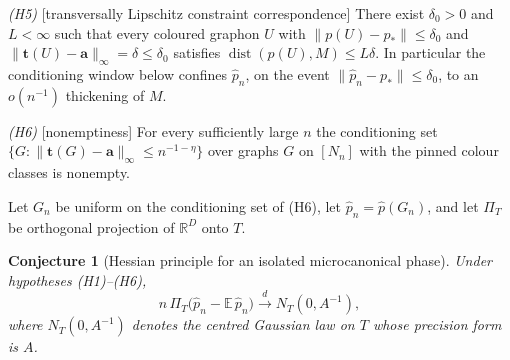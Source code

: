 \documentclass[11pt]{article}
\newtheorem{conjecture}{Conjecture}
\theoremstyle{definition}
\newcommand{\E}{\mathbb E}
\newcommand{\R}{\mathbb R}
\providecommand{\R}{\mathbb R}
\providecommand{\E}{\mathbb E}
\begin{document}
\emph{(H5)} \textup{[transversally Lipschitz constraint
correspondence]}  There exist $\delta_0>0$ and $L<\infty$ such that
every coloured graphon $U$ with $\|p(U)-p_*\|\le\delta_0$ and
$\|\mathbf t(U)-\mathbf a\|_\infty=\delta\le\delta_0$ satisfies
$\operatorname{dist}(p(U),M)\le L\delta$.  In particular the
conditioning window below confines $\widehat p_n$, on the event
$\|\widehat p_n-p_*\|\le\delta_0$, to an $o(n^{-1})$ thickening of
$M$.

\emph{(H6)} \textup{[nonemptiness]}  For every sufficiently large $n$
the conditioning set
$\{G:\|\mathbf t(G)-\mathbf a\|_\infty\le n^{-1-\eta}\}$ over graphs
$G$ on $[N_n]$ with the pinned colour classes is nonempty.

Let $G_n$ be uniform on the conditioning set of (H6), let $\widehat p_n=\widehat p(G_n)$, and let $\Pi_T$ be orthogonal
projection of $\R^D$ onto $T$.

\begin{conjecture}[Hessian principle for an isolated microcanonical phase]\label{t4}
Under hypotheses \textup{(H1)--(H6)},
\[
n\,\Pi_T\bigl(\widehat p_n-\E\,\widehat p_n\bigr)
\xrightarrow{\ d\ }
N_T(0,A^{-1}),
\]
where $N_T(0,A^{-1})$ denotes the centred Gaussian law on $T$ whose
precision form is $A$.
\end{conjecture}
\end{document}
